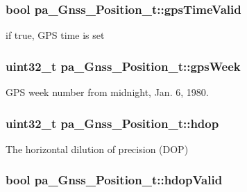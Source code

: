 \subsubsection[{\texorpdfstring{gps\+Time\+Valid}{gpsTimeValid}}]{\setlength{\rightskip}{0pt plus 5cm}bool pa\+\_\+\+Gnss\+\_\+\+Position\+\_\+t\+::gps\+Time\+Valid}\hypertarget{structpa___gnss___position__t_aa3246ace3c59147dbd7f9de233a15d76}{}\label{structpa___gnss___position__t_aa3246ace3c59147dbd7f9de233a15d76}


if true, G\+PS time is set 

\subsubsection[{\texorpdfstring{gps\+Week}{gpsWeek}}]{\setlength{\rightskip}{0pt plus 5cm}uint32\+\_\+t pa\+\_\+\+Gnss\+\_\+\+Position\+\_\+t\+::gps\+Week}\hypertarget{structpa___gnss___position__t_a636a8446ec14317d241e0dbd9f304bfd}{}\label{structpa___gnss___position__t_a636a8446ec14317d241e0dbd9f304bfd}


G\+PS week number from midnight, Jan. 6, 1980. 

\subsubsection[{\texorpdfstring{hdop}{hdop}}]{\setlength{\rightskip}{0pt plus 5cm}uint32\+\_\+t pa\+\_\+\+Gnss\+\_\+\+Position\+\_\+t\+::hdop}\hypertarget{structpa___gnss___position__t_a7dd0659011decfd0cef5fa4e1c6d3ab7}{}\label{structpa___gnss___position__t_a7dd0659011decfd0cef5fa4e1c6d3ab7}


The horizontal dilution of precision (D\+OP) 

\subsubsection[{\texorpdfstring{hdop\+Valid}{hdopValid}}]{\setlength{\rightskip}{0pt plus 5cm}bool pa\+\_\+\+Gnss\+\_\+\+Position\+\_\+t\+::hdop\+Valid}\hypertarget{structpa___gnss___position__t_a3ae7d0d6c92f0fd4053b07489b6d227f}{}\label{structpa___gnss___position__t_a3ae7d0d6c92f0fd4053b07489b6d227f}


